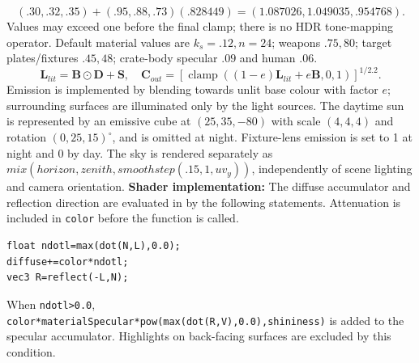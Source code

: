 \[
 (.30,.32,.35)+(.95,.88,.73)(.828449)=(1.087026,1.049035,.954768).
\]
Values may exceed one before the final clamp; there is no HDR tone-mapping operator. Default material values are $k_s=.12,n=24$; weapons $.75,80$; target plates/fixtures $.45,48$; crate-body specular $.09$ and human $.06$.
\[
 \mathbf L_{lit}=\mathbf B\odot\mathbf D+\mathbf S,\quad
 \mathbf C_{out}=\left[\operatorname{clamp}((1-e)\mathbf L_{lit}+e\mathbf B,0,1)\right]^{1/2.2}.
\]
Emission is implemented by blending towards unlit base colour with factor $e$; surrounding surfaces are illuminated only by the light sources. The daytime sun is represented by an emissive cube at $(25,35,-80)$ with scale $(4,4,4)$ and rotation $(0,25,15)^\circ$, and is omitted at night. Fixture-lens emission is set to 1 at night and 0 by day. The sky is rendered separately as $mix(horizon,zenith,smoothstep(.15,1,uv_y))$, independently of scene lighting and camera orientation.
\textbf{Shader implementation:} The diffuse accumulator and reflection direction are evaluated in  by the following statements. Attenuation is included in \texttt{color} before the function is called.
\begin{verbatim}
float ndotl=max(dot(N,L),0.0);
diffuse+=color*ndotl;
vec3 R=reflect(-L,N);
\end{verbatim}
When \texttt{ndotl>0.0}, \texttt{color*materialSpecular*}\allowbreak\texttt{pow(max(dot(R,V),0.0),shininess)} is added to the specular accumulator. Highlights on back-facing surfaces are excluded by this condition.

